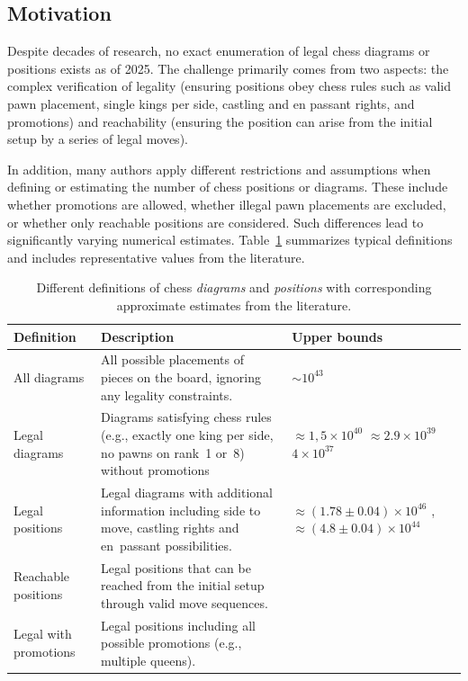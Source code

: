 \documentclass[12pt]{article}
\begin{document}
\subsection{Motivation}

Despite decades of research, no exact enumeration of legal chess diagrams or positions exists as of 2025. 
The challenge primarily comes from two aspects: the complex verification of legality 
(ensuring positions obey chess rules such as valid pawn placement, single kings per side, 
castling and en passant rights, and promotions) and reachability 
(ensuring the position can arise from the initial setup by a series of legal moves). 

In addition, many authors apply different restrictions and assumptions when defining or estimating 
the number of chess positions or diagrams. These include whether promotions are allowed, whether illegal pawn 
placements are excluded, or whether only reachable positions are considered. Such differences lead 
to significantly varying numerical estimates. Table~\ref{tab:definitions} summarizes typical definitions 
and includes representative values from the literature.

\begin{table}[h!]
\centering
\renewcommand{\arraystretch}{1.3}
\begin{tabular}{p{3.8cm} p{6.2cm} p{4.9cm}}
\toprule
\textbf{Definition} & \textbf{Description} & \textbf{Upper bounds} \\
\midrule
All diagrams & All possible placements of pieces on the board, ignoring any legality constraints. 
& $\sim 10^{43}$ \cite{shannon1950} \\[0.3em]

Legal diagrams & Diagrams satisfying chess rules (e.g., exactly one king per side, no pawns on rank~1 or~8) without promotions 
& $\approx 1,5\times10^{40}$ \cite{steinerberger2015} $\approx 2.9\times10^{39}$ \cite{tromp2021b} $4\times 10^{37}$ \cite{gourion2021} \\[0.3em]

Legal positions & Legal diagrams with additional information including side to move, castling rights and en~passant possibilities. 
& $\approx (1.78\pm0.04)\times10^{46}$ \cite{chinchalkar1996} , $\approx (4.8\pm0.04)\times10^{44}$ \cite{tromp2021b} \\[0.3em]

Reachable positions & Legal positions that can be reached from the initial setup through valid move sequences. 
&  \\[0.3em]

Legal with promotions & Legal positions including all possible promotions (e.g., multiple queens). 
& \\
\bottomrule
\end{tabular}
\caption{Different definitions of chess \textit{diagrams} and \textit{positions} with corresponding approximate estimates from the literature.}
\label{tab:definitions}
\end{table}
\end{document}
